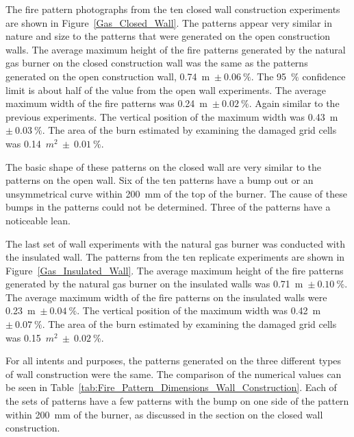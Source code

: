 \documentclass[twoside]{uocthesis}
\begin{document}
The fire pattern photographs from the ten closed wall construction experiments are shown in Figure~\ref{Gas_Closed_Wall}. 
The patterns appear very similar in nature and size to the patterns that were generated on the open construction walls.  The average maximum height of the fire patterns generated by the natural gas burner on the closed construction wall was the same as the patterns generated on the open construction wall, 0.74~m~$\pm~0.06~\%$.  The 95~$\%$ confidence limit is about half of the value from the open wall experiments. The average maximum width of the fire patterns was 0.24~m~$\pm~0.02~\%$.  Again similar to the previous experiments. The vertical position of the maximum width was 0.43~m~$\pm~0.03~\%$. The area of the burn estimated by examining the damaged grid cells was 0.14~$m^2~\pm~0.01~\%$.  

The basic shape of these patterns on the closed wall are very similar to the patterns on the open wall.  Six of the ten patterns have a bump out or an unsymmetrical curve within 200~mm of the top of the burner.  The cause of these bumps in the patterns could not be determined. Three of the patterns have a noticeable lean.     

The last set of wall experiments with the natural gas burner was conducted with the insulated wall.  The patterns from the ten replicate experiments are shown in Figure~\ref{Gas_Insulated_Wall}.  The average maximum height of the fire patterns generated by the natural gas burner on the insulated walls was 0.71~m~$\pm~0.10~\%$.  The average maximum width of the fire patterns on the insulated walls were 0.23~m~$\pm~0.04~\%$.  The vertical position of the maximum width was 0.42~m~$\pm~0.07~\%$. The area of the burn estimated by examining the damaged grid cells was 0.15~$m^2~\pm~0.02~\%$.  


For all intents and purposes, the patterns generated on the three different types of wall construction were the same.  The comparison of the numerical values can be seen in Table~\ref{tab:Fire_Pattern_Dimensions_Wall_Construction}.  Each of the sets of patterns have a few patterns with the bump on one side of the pattern within 200~mm of the burner, as discussed in the section on the closed wall construction. 
\end{document}
